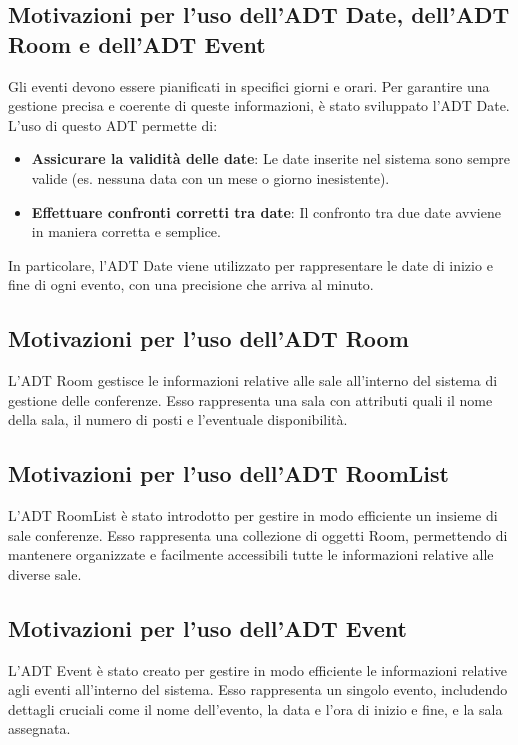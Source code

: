 \documentclass[11pt]{scrartcl} %
\begin{document}
\subsection{Motivazioni per l'uso dell'ADT Date, dell'ADT Room e dell'ADT Event}

 Gli eventi devono essere pianificati in specifici giorni e orari. Per garantire una gestione precisa e coerente di queste informazioni, è stato sviluppato l'ADT Date. L'uso di questo ADT permette di:
\begin{itemize}
    \item \textbf{Assicurare la validità delle date}: Le date inserite nel sistema sono sempre valide (es. nessuna data con un mese o giorno inesistente).
    \item \textbf{Effettuare confronti corretti tra date}: Il confronto tra due date avviene in maniera corretta e semplice.
\end{itemize}
In particolare, l'ADT Date viene utilizzato per rappresentare le date di inizio e fine di ogni evento, con una precisione che arriva al minuto.

\subsection{Motivazioni per l'uso dell'ADT Room}

L'ADT Room gestisce le informazioni relative alle sale all'interno del sistema di gestione delle conferenze. Esso rappresenta una sala con attributi quali il nome della sala, il numero di posti e l'eventuale disponibilità.

\subsection{Motivazioni per l'uso dell'ADT RoomList}

L'ADT RoomList è stato introdotto per gestire in modo efficiente un insieme di sale conferenze. Esso rappresenta una collezione di oggetti Room, permettendo di mantenere organizzate e facilmente accessibili tutte le informazioni relative alle diverse sale.

\subsection{Motivazioni per l'uso dell'ADT Event}

L'ADT Event è stato creato per gestire in modo efficiente le informazioni relative agli eventi all'interno del sistema. Esso rappresenta un singolo evento, includendo dettagli cruciali come il nome dell'evento, la data e l'ora di inizio e fine, e la sala assegnata.
\end{document}

